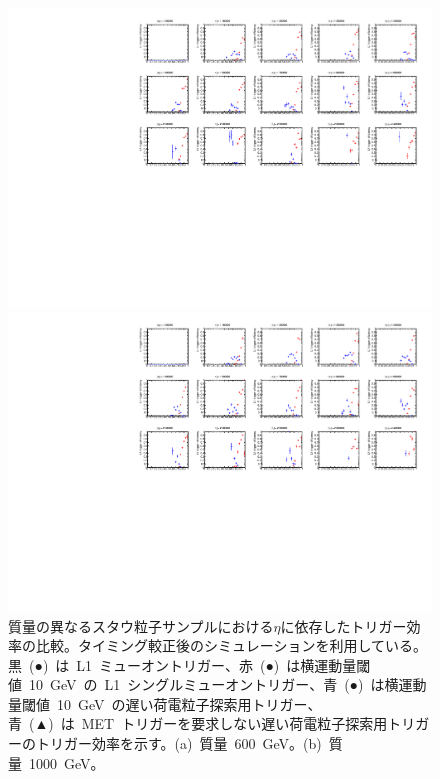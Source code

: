 \begin{figure}[tbp]
    \begin{minipage}{0.49\hsize}
    \centering   
    \includegraphics[width=\textwidth,page=9]{img/rec/stau_600.pdf}
    \subcaption{}
    \end{minipage}
    \begin{minipage}{0.49\hsize}
    \centering   
    \includegraphics[width=\textwidth,page=9]{img/rec/stau_1000.pdf}
    \subcaption{}
    \end{minipage}
    \caption[質量の異なるスタウ粒子サンプルにおける$\eta$に依存したトリガー効率の比較]{質量の異なるスタウ粒子サンプルにおける$\eta$に依存したトリガー効率の比較。タイミング較正後のシミュレーションを利用している。黒~(●)~は~L1~ミューオントリガー、赤~(●)~は横運動量閾値~10~GeV~の~L1~シングルミューオントリガー、青~(●)~は横運動量閾値~10~GeV~の遅い荷電粒子探索用トリガー、青~(▲)~は~MET~トリガーを要求しない遅い荷電粒子探索用トリガーのトリガー効率を示す。(a)~質量~600~GeV。(b)~質量~1000~GeV。}\label{fig:trieta6}
\end{figure}
